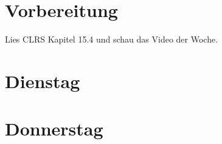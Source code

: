\documentclass{uebung_cs}
\begin{document}
\section*{Vorbereitung}
Lies CLRS Kapitel 15.4 und schau das Video der Woche.

\section*{Dienstag}
\begin{aufgabe}[test]
\end{aufgabe}

\section*{Donnerstag}
\begin{aufgabe}[test]
\end{aufgabe}
\end{document}
